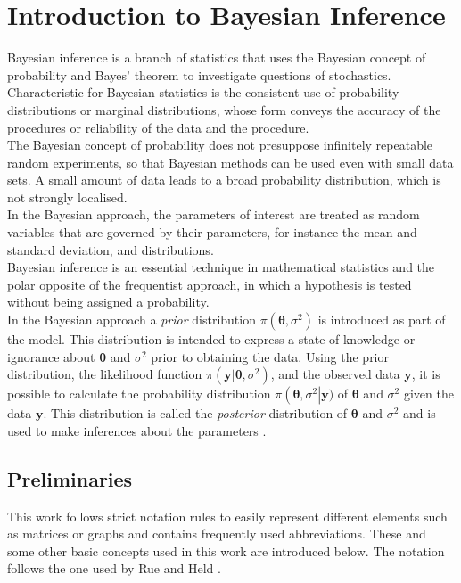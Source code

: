 %
\chapter{Introduction to Bayesian Inference}
\label{sec:bayes}
Bayesian inference is a branch of statistics that uses the Bayesian concept of probability and Bayes' theorem to investigate questions of stochastics. \\
Characteristic for Bayesian statistics is the consistent use of probability distributions or marginal distributions, whose form conveys the accuracy of the procedures or reliability of the data and the procedure. \\
The Bayesian concept of probability does not presuppose infinitely repeatable random experiments, so that Bayesian methods can be used even with small data sets. A small amount of data leads to a broad probability distribution, which is not strongly localised. \\ 
In the Bayesian approach, the parameters of interest are treated as random variables that are governed by their parameters, for instance the mean and standard deviation, and distributions. \\
Bayesian inference is an essential technique in mathematical statistics and the polar opposite of the frequentist approach, in which a hypothesis is tested without being assigned a probability. \\
In the Bayesian approach a \textit{prior} distribution $\pi\left(\pmb{\theta}, \sigma^2\right)$ is introduced as part of the model. This distribution is intended to express a state of knowledge or ignorance about $\pmb{\theta}$ and $\sigma^2$ prior to obtaining the data. Using the prior distribution, the likelihood function $\pi\left(\pmb{y}|\pmb{\theta},\sigma^2\right)$, and the observed data $\pmb{y}$, it is possible to calculate the probability distribution $\pi\left(\pmb{\theta},\sigma^2\right|\pmb{y})$ of $\pmb{\theta}$ and $\sigma^2$ given the data $\pmb{y}$. This distribution is called the \textit{posterior} distribution of $\pmb{\theta}$ and $\sigma^2$ and is used to make inferences about the parameters \autocite[][6]{box2011bayesian}.
\clearpage
\section{Preliminaries}
This work follows strict notation rules to easily represent different elements such as matrices or graphs and contains frequently used abbreviations. These and some other basic concepts used in this work are introduced below. The notation follows the one used by Rue and Held \autocite[][14--19]{rue2005gaussian}.
